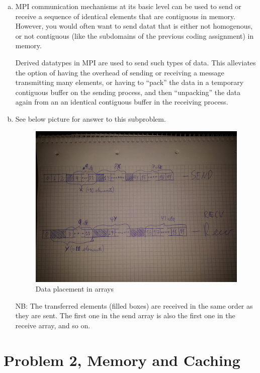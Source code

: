 \documentclass[fontsize=11pt, paper=a4, titlepage]{article}
\begin{document}
\begin{enumerate}[a)]

    \item MPI communication mechanisms at its basic level can be used to send or
receive a sequence of identical elements that are contiguous in memory. However,
you would often want to send datat that is either not homogenous, or not
contiguous (like the subdomains of the previous coding assignment) in memory.

Derived datatypes in MPI are used to send such types of data. This alleviates
the option of having the overhead of sending or receiving a message transmitting
many elements, or having to ``pack'' the data in a temporary contiguous buffer
on the sending process, and then ``unpacking'' the data again from an an
identical contiguous buffer in the receiving process.

    \item See below picture for answer to this subproblem.
        \begin{figure}[H]
            \centering
            \includegraphics[width=1.0\linewidth]{1b.jpg}
            \caption{Data placement in arrays}
            \label{fig:1b}
        \end{figure}
    NB: The transferred elements (filled boxes) are received in the same order
as they are sent. The first one in the send array is also the first one in
the receive array, and so on.


\end{enumerate}

\section{Problem 2, Memory and Caching}
\end{document}

